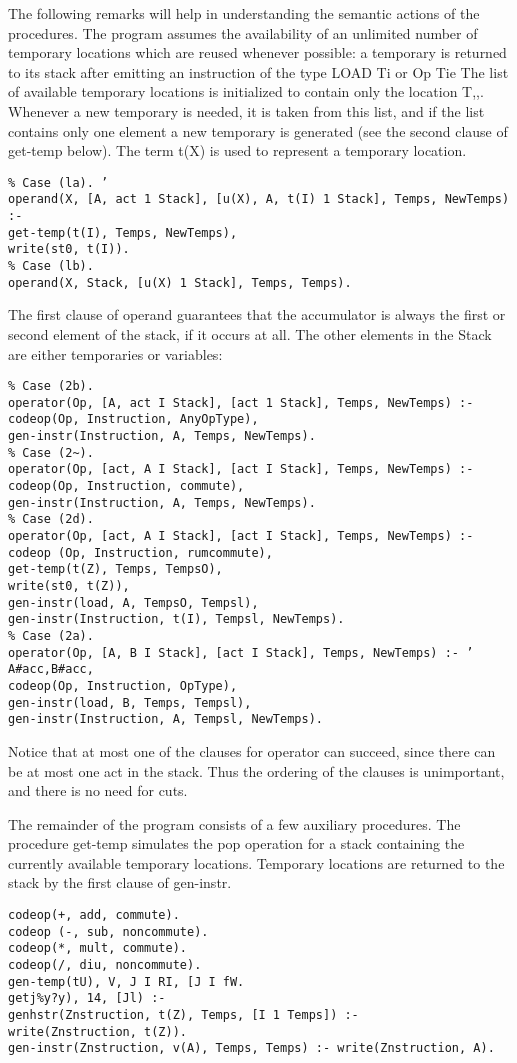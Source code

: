 The following remarks will help in understanding the semantic actions of the
procedures. The program assumes the availability of an unlimited number of
temporary locations which are reused whenever possible: a temporary is returned
to its stack after emitting an instruction of the type LOAD Ti or Op Tie The list
of available temporary locations is initialized to contain only the location T,,.
Whenever a new temporary is needed, it is taken from this list, and if the list
contains only one element a new temporary is generated (see the second clause
of get-temp below). The term t(X) is used to represent a temporary location.
\begin{verbatim}
% Case (la). ’
operand(X, [A, act 1 Stack], [u(X), A, t(I) 1 Stack], Temps, NewTemps) :-
get-temp(t(I), Temps, NewTemps),
write(st0, t(I)).
% Case (lb).
operand(X, Stack, [u(X) 1 Stack], Temps, Temps). 
\end{verbatim}
The first clause of operand guarantees that the accumulator is always the first
or second element of the stack, if it occurs at all. The other elements in the Stack
are either temporaries or variables:   
\begin{verbatim}
% Case (2b).
operator(Op, [A, act I Stack], [act 1 Stack], Temps, NewTemps) :-
codeop(Op, Instruction, AnyOpType),
gen-instr(Instruction, A, Temps, NewTemps).
% Case (2~).
operator(Op, [act, A I Stack], [act I Stack], Temps, NewTemps) :-
codeop(Op, Instruction, commute),
gen-instr(Instruction, A, Temps, NewTemps).
% Case (2d).
operator(Op, [act, A I Stack], [act I Stack], Temps, NewTemps) :-
codeop (Op, Instruction, rumcommute),
get-temp(t(Z), Temps, TempsO),
write(st0, t(Z)),
gen-instr(load, A, TempsO, Tempsl),
gen-instr(Instruction, t(I), Tempsl, NewTemps).
% Case (2a).
operator(Op, [A, B I Stack], [act I Stack], Temps, NewTemps) :- ’
A#acc,B#acc,
codeop(Op, Instruction, OpType),
gen-instr(load, B, Temps, Tempsl),
gen-instr(Instruction, A, Tempsl, NewTemps).
\end{verbatim}

Notice that at most one of the clauses for operator can succeed, since there can
be at most one act in the stack. Thus the ordering of the clauses is unimportant,
and there is no need for cuts. 

The remainder of the program consists of a few auxiliary procedures. The
procedure get-temp simulates the pop operation for a stack containing the
currently available temporary locations. Temporary locations are returned to the
stack by the first clause of gen-instr.
\begin{verbatim}
codeop(+, add, commute).
codeop (-, sub, noncommute).
codeop(*, mult, commute).
codeop(/, diu, noncommute).
gen-temp(tU), V, J I RI, [J I fW.
getj%y?y), 14, [Jl) :-
genhstr(Znstruction, t(Z), Temps, [I 1 Temps]) :-
write(Znstruction, t(Z)).
gen-instr(Znstruction, v(A), Temps, Temps) :- write(Znstruction, A). 
\end{verbatim}

